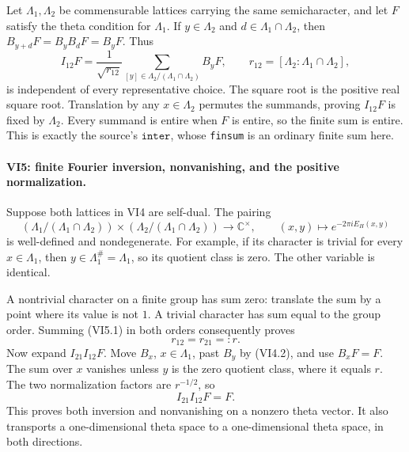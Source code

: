 Let \(\Lambda_1,\Lambda_2\) be commensurable lattices carrying
the same semicharacter, and let \(F\) satisfy the theta condition
for \(\Lambda_1\). If \(y\in\Lambda_2\) and
\(d\in\Lambda_1\cap\Lambda_2\), then
\(B_{y+d}F=B_yB_dF=B_yF\). Thus
\[
 I_{12}F=
 \frac1{\sqrt{r_{12}}}
 \sum_{[y]\in\Lambda_2/(\Lambda_1\cap\Lambda_2)}B_yF,
 \qquad r_{12}=[\Lambda_2:\Lambda_1\cap\Lambda_2],
 \tag{VI4.3}
\]
is independent of every representative choice. The square root
is the positive real square root. Translation by any
\(x\in\Lambda_2\) permutes the summands, proving
\(I_{12}F\) is fixed by \(\Lambda_2\). Every summand is entire
when \(F\) is entire, so the finite sum is entire.
This is exactly the source's \(\texttt{inter}\), whose
\texttt{finsum} is an ordinary finite sum here.

\paragraph{VI5: finite Fourier inversion, nonvanishing, and the positive normalization.}
Suppose both lattices in VI4 are self-dual. The pairing
\[
 (\Lambda_1/(\Lambda_1\cap\Lambda_2))\times
 (\Lambda_2/(\Lambda_1\cap\Lambda_2))
 \longrightarrow\mathbb C^\times,\qquad
 (x,y)\longmapsto e^{-2\pi iE_H(x,y)}
 \tag{VI5.1}
\]
is well-defined and nondegenerate. For example, if its character
is trivial for every \(x\in\Lambda_1\), then
\(y\in\Lambda_1^\#=\Lambda_1\), so its quotient class is zero.
The other variable is identical.

A nontrivial character on a finite group has sum zero: translate
the sum by a point where its value is not \(1\). A trivial
character has sum equal to the group order. Summing (VI5.1)
in both orders consequently proves
\[
                   r_{12}=r_{21}=:r.
 \tag{VI5.2}
\]
Now expand \(I_{21}I_{12}F\). Move \(B_x\), \(x\in\Lambda_1\),
past \(B_y\) by (VI4.2), and use \(B_xF=F\).
The sum over \(x\) vanishes unless \(y\) is the zero quotient
class, where it equals \(r\). The two normalization factors
are \(r^{-1/2}\), so
\[
                         I_{21}I_{12}F=F.
 \tag{VI5.3}
\]
This proves both inversion and nonvanishing on a nonzero
theta vector. It also transports a one-dimensional theta
space to a one-dimensional theta space, in both directions.

